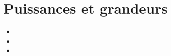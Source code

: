 \chapter{Puissances et grandeurs}\label{ChPuissances}

\vspace{5cm}
\begin{acquis}
\begin{itemize}
\item 
\item 
\item 
\end{itemize}
\end{acquis}


\activites  


\cours


\exercicesbase
\begin{colonne*exercice}

\end{colonne*exercice}


%

\connaissances


%

\Recreation %




